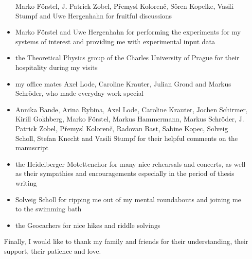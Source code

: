 \begin{itemize}
       Marko Förstel, J. Patrick Zobel,
       P\v{r}emysl Koloren\v{c},
       Sören Kopelke, Vasili Stumpf and Uwe Hergenhahn for fruitful discussions
 \item Marko Förstel and Uwe Hergenhahn for performing the experiments
       for my systems of interest and providing me with experimental input data
 \item the Theoretical Physics group of the Charles University of Prague for
       their hospitality during my visits
 \item my office mates Axel Lode, Caroline Krauter, Julian Grond and Markus
       Schröder, who made everyday work special
 \item Annika Bande, Arina Rybina, Axel Lode, Caroline Krauter, Jochen Schirmer,
       Kirill Gokhberg, Marko Förstel, Markus Hammermann,
       Markus Schröder, J. Patrick Zobel, P\v{r}emysl Koloren\v{c},
       Radovan Bast, Sabine Kopec, Solveig Scholl, Stefan Knecht
       and Vasili Stumpf for their helpful comments on the manuscript
 \item the Heidelberger Motettenchor for many nice rehearsals and concerts,
       as well as their sympathies and encouragements especially in the period
       of thesis writing
 \item Solveig Scholl for ripping me out of my mental roundabouts and
       joining me to the swimming bath
 \item the Geocachers for nice hikes and riddle solvings
\end{itemize}

Finally, I would like to thank my family and friends for their understanding,
their support, their patience and love.
